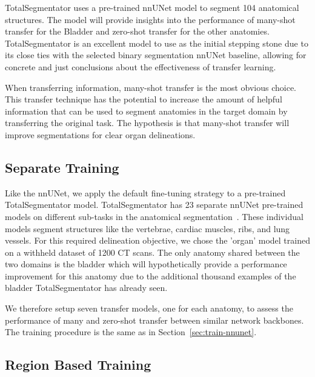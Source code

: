 \documentclass[11pt,twoside]{report}
\begin{document}
TotalSegmentator uses a pre-trained nnUNet model to segment 104 anatomical structures. The model will provide insights into the performance of many-shot transfer for the Bladder and zero-shot transfer for the other anatomies. TotalSegmentator is an excellent model to use as the initial stepping stone due to its close ties with the selected binary segmentation nnUNet baseline, allowing for concrete and just conclusions about the effectiveness of transfer learning.

When transferring information, many-shot transfer is the most obvious choice. This transfer technique has the potential to increase the amount of helpful information that can be used to segment anatomies in the target domain by transferring the original task. The hypothesis is that many-shot transfer will improve segmentations for clear organ delineations. 

\subsection{Separate Training}

Like the nnUNet, we apply the default fine-tuning strategy to a pre-trained TotalSegmentator model. TotalSegmentator has 23 separate nnUNet pre-trained models on different sub-tasks in the anatomical segmentation~\cite{totalsegmentor-git}. These individual models segment structures like the vertebrae, cardiac muscles, ribs, and lung vessels. For this required delineation objective, we chose the 'organ' model trained on a withheld dataset of 1200 CT scans. The only anatomy shared between the two domains is the bladder which will hypothetically provide a performance improvement for this anatomy due to the additional thousand examples of the bladder TotalSegmentator has already seen.

We therefore setup seven transfer models, one for each anatomy, to assess the performance of many and zero-shot transfer between similar network backbones. The training procedure is the same as in Section~\ref{sec:train-nnunet}.

\subsection{Region Based Training}
\end{document}

